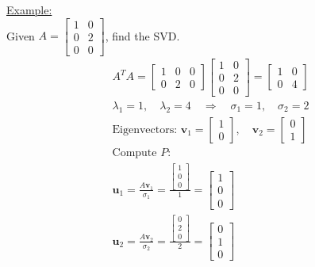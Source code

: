 \documentclass[8pt, a4paper, landscape]{extarticle} %
\begin{document}
\begin{multicols*}{4}
  \underline{Example:}\\
  Given \( A = \begin{bmatrix} 1 & 0 \\ 0 & 2 \\ 0 & 0 \end{bmatrix} \), find the SVD.
  \[
    \begin{aligned}
       & A^T A = \begin{bmatrix} 1 & 0 & 0 \\ 0 & 2 & 0 \end{bmatrix} \begin{bmatrix} 1 & 0 \\ 0 & 2 \\ 0 & 0 \end{bmatrix} = \begin{bmatrix} 1 & 0 \\ 0 & 4 \end{bmatrix} \\
       & \lambda_1 = 1, \quad \lambda_2 = 4 \quad \Rightarrow \quad \sigma_1 = 1, \quad \sigma_2 = 2                                                                       \\
       & \text{Eigenvectors: } \mathbf{v}_1 = \begin{bmatrix} 1 \\ 0 \end{bmatrix}, \quad \mathbf{v}_2 = \begin{bmatrix} 0 \\ 1 \end{bmatrix}                              \\
       & \text{Compute } P:                                                                                                                                                \\
       & \mathbf{u}_1 = \frac{A \mathbf{v}_1}{\sigma_1} = \frac{\begin{bmatrix} 1 \\ 0 \\ 0 \end{bmatrix}}{1} = \begin{bmatrix} 1 \\ 0 \\ 0 \end{bmatrix}                  \\
       & \mathbf{u}_2 = \frac{A \mathbf{v}_2}{\sigma_2} = \frac{\begin{bmatrix} 0 \\ 2 \\ 0 \end{bmatrix}}{2} = \begin{bmatrix} 0 \\ 1 \\ 0 \end{bmatrix}                  \\

\end{aligned}\]
\end{multicols*}
\end{document}
